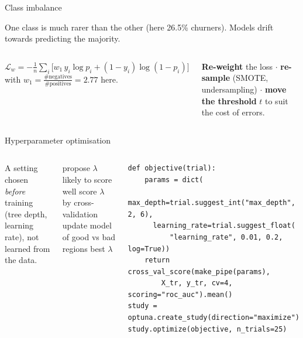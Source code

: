 \documentclass[aspectratio=169,11pt]{beamer}
\begin{document}

\begin{frame}{Class imbalance}
\begin{bdef}
One class is much rarer than the other (here 26.5\% churners). Models drift towards predicting the majority.
\end{bdef}
\begin{columns}[T]
\begin{bmath}
$\mathcal{L}_w=-\frac1n\sum_i\big[w_1\,y_i\log p_i+(1-y_i)\log(1-p_i)\big]$\\[3pt]
with $w_1=\frac{\#\text{negatives}}{\#\text{positives}}=2.77$ here.
\end{bmath}
\begin{bex}
\textbf{Re-weight} the loss $\cdot$ \textbf{re-sample} (SMOTE, undersampling) $\cdot$ \textbf{move the threshold} $t$ to suit the cost of errors.
\end{bex}
\end{columns}
\end{frame}

\begin{frame}[fragile]{Hyperparameter optimisation}
\begin{columns}[T]
\begin{bdef}[Hyperparameter]
A setting chosen \emph{before} training (tree depth, learning rate), not learned from the data.
\end{bdef}
\begin{balgo}
\begin{algorithmic}[1]
  \State propose $\lambda$ likely to score well
  \State score $\lambda$ by cross-validation
  \State update model of good vs bad regions
\EndFor
\State \Return best $\lambda$
\end{algorithmic}
\end{balgo}
\begin{bcode}
\begin{lstlisting}
def objective(trial):
    params = dict(
      max_depth=trial.suggest_int("max_depth", 2, 6),
      learning_rate=trial.suggest_float(
          "learning_rate", 0.01, 0.2, log=True))
    return cross_val_score(make_pipe(params),
        X_tr, y_tr, cv=4, scoring="roc_auc").mean()
study = optuna.create_study(direction="maximize")
study.optimize(objective, n_trials=25)
\end{lstlisting}
\end{bcode}
\end{columns}
\end{frame}
\end{document}
